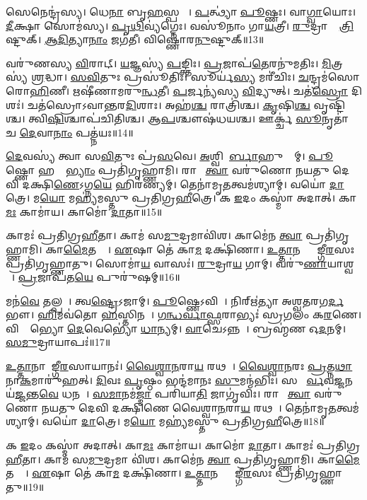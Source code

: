 𑌸𑍇𑌨𑍇𑌨𑍍𑌦𑍍𑌰॑𑌸𑍍𑌯। 
𑌧𑍇\ul{𑌨𑌾} 𑌬𑍃\ul{𑌹}𑌸𑍍𑌪𑌤𑍇𑌃᳚। 
\ul{𑌪}𑌤𑍍𑌥𑍍𑌯𑌾॑ \ul{𑌪𑍂}𑌷𑍍𑌣𑌃। 
𑌵𑌾\ul{𑌗𑍍𑌵𑌾}𑌯𑍋𑌃। 
\ul{𑌦𑍀}𑌕𑍍𑌷𑌾 𑌸𑍋𑌮॑𑌸𑍍𑌯। 
\ul{𑌪𑍃}\ul{𑌥𑌿}𑌵𑍍𑌯॑𑌗𑍍𑌨𑍇𑌃। 
𑌵𑌸𑍂॑𑌨𑌾𑌂  𑌗𑌾\ul{𑌯}𑌤𑍍𑌰𑍀। 
\ul{𑌰𑍁}𑌦𑍍𑌰𑌾𑌣𑌾𑌂᳚ \ul{𑌤𑍍𑌰𑌿}𑌷𑍍𑌟𑍁𑌕𑍍। 
\ul{𑌆}\ul{𑌦𑌿}𑌤𑍍𑌯𑌾\ul{𑌨𑌾𑌂} 𑌜𑌗॑𑌤𑍀। 
𑌵𑌿𑌷𑍍𑌣𑍋॑𑌰\ul{𑌨𑍁}𑌷𑍍𑌟𑍁𑌕𑍍॥13॥%

𑌵𑌰𑍁॑𑌣𑌸𑍍𑌯 \ul{𑌵𑌿}𑌰𑌾𑌟𑍍। 
\ul{𑌯}𑌜𑍍𑌞𑌸𑍍𑌯॑ \ul{𑌪}𑌙𑍍𑌕𑍍𑌤𑌿𑌃। 
\ul{𑌪𑍍𑌰}𑌜𑌾𑌪॑\ul{𑌤𑍇}𑌰𑌨𑍁॑𑌮𑌤𑌿𑌃। 
\ul{𑌮𑌿}𑌤𑍍𑌰𑌸𑍍𑌯॑ \ul{𑌶𑍍𑌰}𑌦𑍍𑌧𑌾। 
\ul{𑌸}\ul{𑌵𑌿}𑌤𑍁𑌃 𑌪𑍍𑌰𑌸𑍂॑𑌤𑌿𑌃। 
𑌸𑍂𑌰𑍍𑌯॑\ul{𑌸𑍍𑌯} 𑌮𑌰𑍀॑𑌚𑌿𑌃। 
\ul{𑌚}𑌨𑍍𑌦𑍍𑌰𑌮॑𑌸𑍋 𑌰𑍋\ul{𑌹𑌿}𑌣𑍀। 
𑌋𑌷𑍀॑𑌣𑌾𑌮𑌰𑍁\ul{𑌨𑍍𑌧}𑌤𑍀। 
\ul{𑌪}𑌰𑍍𑌜𑌨𑍍𑌯॑𑌸𑍍𑌯 \ul{𑌵𑌿}𑌦𑍍𑌯𑍁𑌤𑍍। 
𑌚𑌤॑\ul{𑌸𑍍𑌰𑍋} 𑌦𑌿𑌶𑌃॑। 
𑌚𑌤॑𑌸𑍍𑌰𑍋𑌽𑌵𑌾𑌨𑍍𑌤𑌰\ul{𑌦𑌿}𑌶𑌾𑌃। 
𑌅𑌹॑\ul{𑌶𑍍𑌚} 𑌰𑌾𑌤𑍍𑌰𑌿॑𑌶𑍍𑌚। 
\ul{𑌕𑍃}𑌷𑌿\ul{𑌶𑍍𑌚} 𑌵𑍃𑌷𑍍𑌟𑌿॑𑌶𑍍𑌚। 
𑌤𑍍𑌵𑌿\ul{𑌷𑌿}𑌶𑍍𑌚𑌾𑌪॑𑌚𑌿𑌤𑌿𑌶𑍍𑌚। 
𑌆\ul{𑌪}𑌶𑍍𑌚𑍗𑌷॑𑌧𑌯𑌶𑍍𑌚। 
𑌊𑌰𑍍𑌕𑍍𑌚॑ \ul{𑌸𑍂}𑌨𑍃𑌤𑌾॑ 𑌚 \ul{𑌦𑍇}𑌵𑌾\ul{𑌨𑌾𑌂} 𑌪𑌤𑍍𑌨॑𑌯𑌃॥14॥%
\anuvakamend[\ul{𑌅}\ul{𑌨𑍁}𑌷𑍍𑌟𑍁𑌗𑍍𑌦𑌿\ul{𑌶𑌃} 𑌷𑌟𑍍𑌚॑]

\ul{𑌦𑍇}𑌵𑌸𑍍𑌯॑ 𑌤𑍍𑌵𑌾 𑌸\ul{𑌵𑌿}𑌤𑍁𑌃 𑌪𑍍𑌰॑\ul{𑌸}𑌵𑍇। 
\ul{𑌅}𑌶𑍍𑌵𑌿𑌨𑍋᳚\ul{𑌰𑍍𑌬𑌾}𑌹𑍁𑌭𑍍𑌯𑌾᳚𑌮𑍍। 
\ul{𑌪𑍂}𑌷𑍍𑌣𑍋 𑌹𑌸𑍍𑌤𑌾᳚\ul{𑌭𑍍𑌯𑌾𑌂} 𑌪𑍍𑌰𑌤𑌿॑𑌗𑍃𑌹𑍍𑌣𑌾𑌮𑌿। 
𑌰𑌾𑌜𑌾᳚ \ul{𑌤𑍍𑌵𑌾} 𑌵𑌰𑍁॑𑌣𑍋 𑌨𑌯𑌤𑍁 𑌦𑍇𑌵𑌿 𑌦𑌕𑍍𑌷𑌿\ul{𑌣𑍇}𑌽𑌗𑍍𑌨\ul{𑌯𑍇} 𑌹𑌿𑌰॑𑌣𑍍𑌯𑌮𑍍। 
𑌤𑍇𑌨𑌾॑𑌮𑍃\ul{𑌤}𑌤𑍍𑌵𑌮॑𑌶𑍍𑌯𑌾𑌮𑍍। 
𑌵𑌯𑍋॑ \ul{𑌦𑌾}𑌤𑍍𑌰𑍇। 
𑌮\ul{𑌯𑍋} 𑌮𑌹𑍍𑌯॑𑌮𑌸𑍍𑌤𑍁 𑌪𑍍𑌰𑌤𑌿𑌗𑍍𑌰\ul{𑌹𑍀}𑌤𑍍𑌰𑍇। 
𑌕 \ul{𑌇}𑌦𑌂 𑌕𑌸𑍍𑌮𑌾॑ 𑌅𑌦𑌾𑌤𑍍। 
𑌕𑌾\ul{𑌮𑌃} 𑌕𑌾𑌮𑌾॑𑌯। 
𑌕𑌾𑌮𑍋॑ \ul{𑌦𑌾}𑌤𑌾॥15॥

𑌕𑌾𑌮𑌃॑ 𑌪𑍍𑌰𑌤𑌿𑌗𑍍𑌰\ul{𑌹𑍀}𑌤𑌾। 
𑌕𑌾𑌮॑ 𑌸\ul{𑌮𑍁}𑌦𑍍𑌰𑌮𑌾𑌵𑌿॑𑌶। 
𑌕𑌾𑌮𑍇॑𑌨 \ul{𑌤𑍍𑌵𑌾} 𑌪𑍍𑌰𑌤𑌿॑𑌗𑍃𑌹𑍍𑌣𑌾𑌮𑌿। 
𑌕𑌾\ul{𑌮𑍈}𑌤𑌤𑍍𑌤𑍇᳚। 
\ul{𑌏}𑌷𑌾 𑌤𑍇॑ 𑌕𑌾\ul{𑌮} 𑌦𑌕𑍍𑌷𑌿॑𑌣𑌾। 
\ul{𑌉}\ul{𑌤𑍍𑌤𑌾}𑌨𑌸𑍍𑌤𑍍𑌵𑌾᳚𑌙𑍍𑌗𑍀\ul{𑌰}𑌸𑌃 𑌪𑍍𑌰𑌤𑌿॑𑌗𑍃𑌹𑍍𑌣𑌾𑌤𑍁। 
𑌸𑍋𑌮𑌾॑\ul{𑌯} 𑌵𑌾𑌸𑌃॑। 
\ul{𑌰𑍁}𑌦𑍍𑌰𑌾\ul{𑌯} 𑌗𑌾𑌮𑍍। 
𑌵𑌰𑍁॑\ul{𑌣𑌾}𑌯𑌾𑌶𑍍𑌵𑌮𑍍᳚। 
\ul{𑌪𑍍𑌰}𑌜𑌾𑌪॑𑌤\ul{𑌯𑍇} 𑌪𑍁𑌰𑍁॑𑌷𑌮𑍍॥16॥%

𑌮𑌨॑\ul{𑌵𑍇} 𑌤𑌲𑍍𑌪𑌮𑍍᳚। 
𑌤𑍍𑌵\ul{𑌷𑍍𑌟𑍍𑌰𑍇}𑌽𑌜𑌾𑌮𑍍। 
\ul{𑌪𑍂}𑌷𑍍𑌣𑍇𑌽𑌵𑌿𑌮𑍍᳚। 
𑌨𑌿𑌰𑍍\mbox{}𑌋॑𑌤𑍍𑌯𑌾 𑌅𑌶𑍍𑌵𑌤𑌰𑌗\ul{𑌰𑍍𑌦}𑌭𑍗। 
\ul{𑌹𑌿}𑌮𑌵॑𑌤𑍋 \ul{𑌹}𑌸𑍍𑌤𑌿𑌨𑌮𑍍᳚। 
\ul{𑌗}\ul{𑌨𑍍𑌧}\ul{𑌰𑍍𑌵𑌾}\ul{𑌫𑍍𑌸}𑌰𑌾𑌭𑍍𑌯𑌃॑ 𑌸𑍍𑌰𑌗𑌲𑌂 𑌕\ul{𑌰}𑌣𑍇। 
𑌵𑌿𑌶𑍍𑌵𑍇᳚𑌭𑍍𑌯𑍋 \ul{𑌦𑍇}𑌵𑍇𑌭𑍍𑌯𑍋॑ \ul{𑌧𑌾}𑌨𑍍𑌯𑌮𑍍। 
\ul{𑌵𑌾}𑌚𑍇𑌽𑌨𑍍𑌨𑌮𑍍᳚। 
𑌬𑍍𑌰𑌹𑍍𑌮॑𑌣 𑌓\ul{𑌦}𑌨𑌮𑍍। 
\ul{𑌸}\ul{𑌮𑍁}𑌦𑍍𑌰𑌾𑌯𑌾𑌪𑌃॑॥17॥

\ul{𑌉}\ul{𑌤𑍍𑌤𑌾}𑌨𑌾𑌯𑌾᳚𑌙𑍍𑌗𑍀\ul{𑌰}𑌸𑌾𑌯𑌾𑌨𑌃॑। 
\ul{𑌵𑍈}\ul{𑌶𑍍𑌵𑌾}\ul{𑌨}𑌰𑌾\ul{𑌯} 𑌰𑌥𑌮𑍍᳚। 
\ul{𑌵𑍈}\ul{𑌶𑍍𑌵𑌾}\ul{𑌨}𑌰𑌃 \ul{𑌪𑍍𑌰}𑌤𑍍𑌨\ul{𑌥𑌾} 𑌨𑌾\ul{𑌕}𑌮𑌾𑌰𑍁॑𑌹𑌤𑍍। 
\ul{𑌦𑌿}𑌵𑌃 \ul{𑌪𑍃}𑌷𑍍𑌠𑌂 𑌭𑌨𑍍𑌦॑𑌮𑌾𑌨𑌃 \ul{𑌸𑍁}𑌮𑌨𑍍𑌮॑𑌭𑌿𑌃। 
𑌸 𑌪𑍂᳚\ul{𑌰𑍍𑌵}𑌵\ul{𑌜𑍍𑌜}𑌨𑌯॑\ul{𑌜𑍍𑌜}𑌨𑍍𑌤\ul{𑌵𑍇} 𑌧𑌨𑌮𑍍᳚। 
\ul{𑌸}\ul{𑌮𑌾}𑌨𑌮॑\ul{𑌜𑍍𑌮𑌾} 𑌪𑌰𑌿॑𑌯𑌾\ul{𑌤𑌿} 𑌜𑌾𑌗𑍃॑𑌵𑌿𑌃। 
𑌰𑌾𑌜𑌾᳚ \ul{𑌤𑍍𑌵𑌾} 𑌵𑌰𑍁॑𑌣𑍋 𑌨𑌯𑌤𑍁 𑌦𑍇𑌵𑌿 𑌦𑌕𑍍𑌷𑌿𑌣𑍇 𑌵𑍈𑌶𑍍𑌵𑌾\ul{𑌨}𑌰𑌾\ul{𑌯} 𑌰𑌥𑌮𑍍᳚। 
𑌤𑍇𑌨𑌾॑𑌮𑍃\ul{𑌤}𑌤𑍍𑌵𑌮॑𑌶𑍍𑌯𑌾𑌮𑍍। 
𑌵𑌯𑍋॑ \ul{𑌦𑌾}𑌤𑍍𑌰𑍇। 
𑌮\ul{𑌯𑍋} 𑌮𑌹𑍍𑌯॑𑌮𑌸𑍍𑌤𑍁 𑌪𑍍𑌰𑌤𑌿𑌗𑍍𑌰\ul{𑌹𑍀}𑌤𑍍𑌰𑍇॥18॥

𑌕 \ul{𑌇}𑌦𑌂 𑌕𑌸𑍍𑌮𑌾॑ 𑌅𑌦𑌾𑌤𑍍। 
𑌕𑌾\ul{𑌮𑌃} 𑌕𑌾𑌮𑌾॑𑌯। 
𑌕𑌾𑌮𑍋॑ \ul{𑌦𑌾}𑌤𑌾। 
𑌕𑌾𑌮𑌃॑ 𑌪𑍍𑌰𑌤𑌿𑌗𑍍𑌰\ul{𑌹𑍀}𑌤𑌾। 
𑌕𑌾𑌮॑ 𑌸\ul{𑌮𑍁}𑌦𑍍𑌰𑌮𑌾 𑌵𑌿॑𑌶। 
𑌕𑌾𑌮𑍇॑𑌨 \ul{𑌤𑍍𑌵𑌾} 𑌪𑍍𑌰𑌤𑌿॑𑌗𑍃𑌹𑍍𑌣𑌾𑌮𑌿। 
𑌕𑌾\ul{𑌮𑍈}𑌤𑌤𑍍𑌤𑍇᳚। 
\ul{𑌏}𑌷𑌾 𑌤𑍇॑ 𑌕𑌾\ul{𑌮} 𑌦𑌕𑍍𑌷𑌿॑𑌣𑌾। 
\ul{𑌉}\ul{𑌤𑍍𑌤𑌾}𑌨𑌸𑍍𑌤𑍍𑌵𑌾᳚𑌙𑍍𑌗𑍀\ul{𑌰}𑌸𑌃 𑌪𑍍𑌰𑌤𑌿॑𑌗𑍃𑌹𑍍𑌣𑌾𑌤𑍁॥19॥
\anuvakamend[\ul{𑌦𑌾}𑌤𑌾 𑌪𑍁𑌰𑍁॑\ul{𑌷}𑌮𑌪𑌃॑ 𑌪𑍍𑌰𑌤𑌿𑌗𑍍𑌰\ul{𑌹𑍀}𑌤𑍍𑌰𑍇 𑌨𑌵॑ 𑌚]

